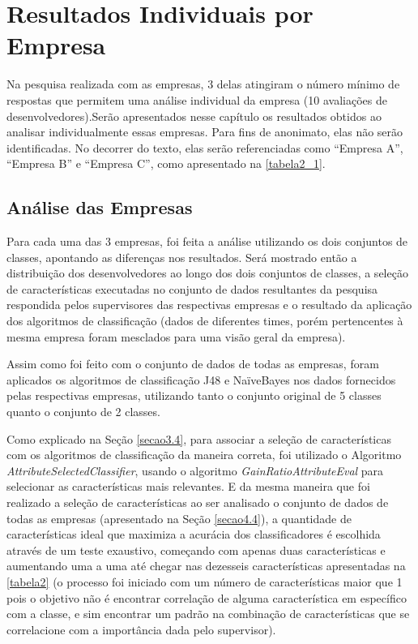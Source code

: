 \chapter[Resultados Individuais por Empresa]{Resultados Individuais por Empresa}\label{resultados_individuais}

Na pesquisa realizada com as empresas, 3 delas atingiram o número mínimo de respostas que permitem uma análise individual da empresa (10 avaliações de desenvolvedores).Serão apresentados nesse capítulo os resultados obtidos ao analisar individualmente essas empresas. Para fins de anonimato, elas não serão identificadas. No decorrer do texto, elas serão referenciadas como ``Empresa A'', ``Empresa B'' e ``Empresa C'', como apresentado na \autoref{tabela2_1}.

\section{Análise das Empresas}

Para cada uma das 3 empresas, foi feita a análise utilizando os dois conjuntos de classes, apontando as diferenças nos resultados. Será mostrado então a distribuição dos desenvolvedores ao longo dos dois conjuntos de classes, a seleção de características executadas no conjunto de dados resultantes da pesquisa respondida pelos supervisores das respectivas empresas e o resultado da aplicação dos algoritmos de classificação (dados de diferentes times, porém pertencentes à mesma empresa foram mesclados para uma visão geral da empresa).

Assim como foi feito com o conjunto de dados de todas as empresas, foram aplicados os algoritmos de classificação J48 e NaïveBayes nos dados fornecidos pelas respectivas empresas, utilizando tanto o conjunto original de 5 classes quanto o conjunto de 2 classes. 

Como explicado na Seção \ref{secao3.4}, para associar a seleção de características com os algoritmos de classificação da maneira correta, foi utilizado o Algoritmo \textit{AttributeSelectedClassifier}, usando o algoritmo \textit{GainRatioAttributeEval} para selecionar as características mais relevantes. E da mesma maneira que foi realizado a seleção de características ao ser analisado o conjunto de dados de todas as empresas (apresentado na Seção \ref{secao4.4}), a quantidade de características ideal que maximiza a acurácia dos classificadores é escolhida através de um teste exaustivo, começando com apenas duas características e aumentando uma a uma até chegar nas dezesseis características apresentadas na \autoref{tabela2} (o processo foi iniciado com um número de características maior que 1 pois o objetivo não é encontrar correlação de alguma característica em específico com a classe, e sim encontrar um padrão na combinação de características que se correlacione com a importância dada pelo supervisor).

